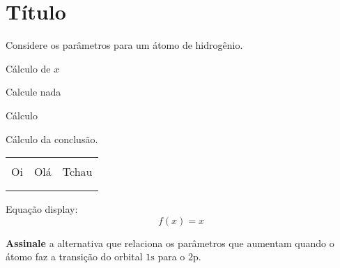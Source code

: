 \section{Título}

Considere os parâmetros para um átomo de hidrogênio.

\begin{example}{

Cálculo de \(x\)

}

Calcule nada


Cálculo


Cálculo da conclusão.

\end{example}

\begin{tabular}{lrc}

\toprule\\
Oi & Olá & Tchau\\
\midrule\\
\bottomrule\\
\end{tabular}

Equação display: \[
    f(x) = x
\]

\textbf{Assinale} a alternativa que relaciona os parâmetros que aumentam quando o átomo faz a transição do orbital \(\mathrm{1s}\) para o
\(\mathrm{2p}\).